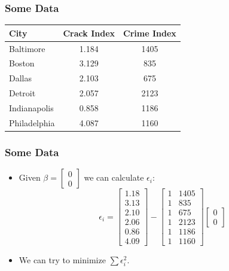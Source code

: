 \documentclass{beamer}
\begin{document}
\begin{frame} 
\frametitle[alignment=center]{Some Data}
\begin{table}
\centering
\begin{tabular}{lcc}
City & Crack Index & Crime Index \\
\hline\hline
Baltimore & 1.184 & 1405\\
Boston & 3.129 & 835\\
Dallas & 2.103 & 675\\
Detroit & 2.057 & 2123\\
Indianapolis & 0.858 & 1186\\
Philadelphia & 4.087 & 1160\\
\hline
\end{tabular}
\end{table}
\end{frame}

\begin{frame}
\frametitle[alignment=center]{Some Data}
\begin{itemize}
\item Given $\beta=\left[\begin{array}{c}0 \\ 0\end{array}\right]$ we can calculate $\epsilon_i$:
$$\epsilon_i=\left[\begin{array}{c}1.18 \\ 3.13 \\ 2.10 \\ 2.06 \\ 0.86 \\ 4.09\end{array}\right]-\left[\begin{array}{cc}1 & 1405 \\ 1 & 835 \\ 1 & 675 \\ 1 & 2123 \\ 1 & 1186 \\ 1 & 1160\end{array}\right]\left[\begin{array}{cc}0 \\ 0\end{array}\right]$$
\item We can try to minimize $\sum \epsilon_i^2$.
\end{itemize}
\end{frame}
\end{document}
